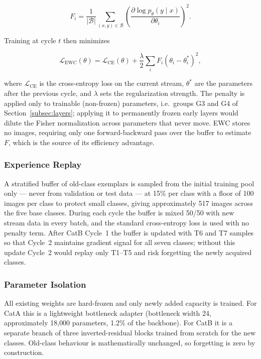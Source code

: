 \documentclass[journal]{IEEEtran}
\begin{document}
\begin{equation}
F_i = \frac{1}{|\mathcal{B}|}\sum_{(x,y)\in\mathcal{B}}
\left(\frac{\partial \log p_\theta(y \mid x)}{\partial \theta_i}\right)^{\!2}.
\label{eq:fisher}
\end{equation}

Training at cycle $t$ then minimizes

\begin{equation}
\mathcal{L}_{\text{EWC}}(\theta) = \mathcal{L}_{\text{CE}}(\theta)
+ \frac{\lambda}{2}\sum_{i} F_i \left(\theta_i - \theta_{i}^{*}\right)^{2},
\label{eq:ewc}
\end{equation}

where $\mathcal{L}_{\text{CE}}$ is the cross-entropy loss on the current stream,
$\theta^{*}$ are the parameters after the previous cycle, and $\lambda$ sets the
regularization strength. The penalty is applied only to trainable (non-frozen)
parameters, i.e.\ groups G3 and G4 of Section~\ref{subsec:layers}; applying it to
permanently frozen early layers would dilute the Fisher normalization across
parameters that never move. EWC stores no images, requiring only one forward-backward
pass over the buffer to estimate $F$, which is the source of its efficiency advantage.

\subsubsection{Experience Replay}
A stratified buffer of old-class exemplars is sampled from the initial training pool
only --- never from validation or test data --- at 15\% per class with a floor of 100
images per class to protect small classes, giving approximately 517 images across the
five base classes. During each cycle the buffer is mixed 50/50 with new stream data
in every batch, and the standard cross-entropy loss is used with no penalty term.
After CatB Cycle~1 the buffer is updated with T6 and T7 samples so that Cycle~2
maintains gradient signal for all seven classes; without this update Cycle~2 would
replay only T1--T5 and risk forgetting the newly acquired classes.

\subsubsection{Parameter Isolation}
All existing weights are hard-frozen and only newly added capacity is trained. For
CatA this is a lightweight bottleneck adapter (bottleneck width 24, approximately
18{,}000 parameters, 1.2\% of the backbone). For CatB it is a separate branch of
three inverted-residual blocks trained from scratch for the new classes. Old-class
behaviour is mathematically unchanged, so forgetting is zero by construction.
\end{document}
